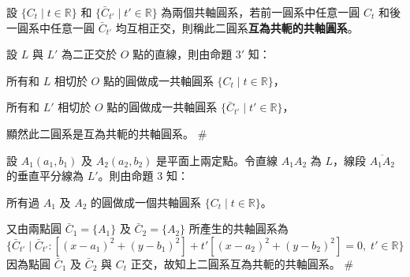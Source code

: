 \begin{definition*}
設 $\{C_t \mid t \in \mathbb{R}\}$ 和 $\{\bar{C}_{t'} \mid t' \in \mathbb{R}\}$ 為兩個共軸圓系，若前一圓系中任意一圓 $C_t$ 和後一圓系中任意一圓 $\bar{C}_{t'}$ 均互相正交，則稱此二圓系\textbf{互為共軛的共軸圓系}。
\end{definition*}

\begin{example}
設 $L$ 與 $L'$ 為二正交於 $O$ 點的直線，則由命題 $3'$ 知：

所有和 $L$ 相切於 $O$ 點的圓做成一共軸圓系 $\{C_t \mid t \in \mathbb{R}\}$，

所有和 $L'$ 相切於 $O$ 點的圓做成一共軸圓系 $\{\bar{C}_{t'} \mid t' \in \mathbb{R}\}$，

顯然此二圓系是互為共軛的共軸圓系。 \hfill $\#$
\end{example}

\begin{center}
\end{center}

\newpage
\begin{example}
設 $A_1(a_1, b_1)$ 及 $A_2(a_2, b_2)$ 是平面上兩定點。令直線 $A_1 A_2$ 為 $L$，線段 $\overline{A_1 A_2}$ 的垂直平分線為 $L'$。則由命題 3 知：

所有過 $A_1$ 及 $A_2$ 的圓做成一個共軸圓系 $\{C_t \mid t \in \mathbb{R}\}$。

又由兩點圓 $\bar{C}_1 = \{A_1\}$ 及 $\bar{C}_2 = \{A_2\}$ 所產生的共軸圓系為
\[
\{\bar{C}_{t'} \mid \bar{C}_{t'}: [(x-a_1)^2+(y-b_1)^2] + t'[(x-a_2)^2+(y-b_2)^2] = 0, \; t' \in \mathbb{R}\}
\]
因為點圓 $\bar{C}_1$ 及 $\bar{C}_2$ 與 $C_t$ 正交，故知上二圓系互為共軛的共軸圓系。 \hfill $\#$
\end{example}

